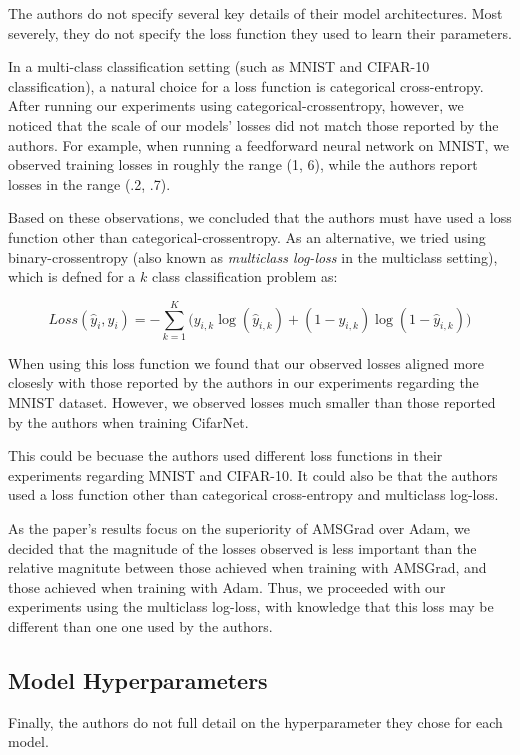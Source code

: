 \documentclass[letterpaper, 10 pt, conference]{ieeeconf}  %
\begin{document}
The authors do not specify several key details of their model architectures. Most severely, they do not specify the loss function they used to learn their parameters. 

In a multi-class classification setting (such as MNIST and CIFAR-10 classification), a natural choice for a loss function is categorical cross-entropy. After running our experiments using categorical-crossentropy, however, we noticed that the scale of our models' losses did not match those reported by the authors. For example, when running a feedforward neural network on MNIST, we observed training losses in roughly the range (1, 6), while the authors report losses in the range (.2, .7). 

Based on these observations, we concluded that the authors must have used a loss function other than categorical-crossentropy. As an alternative, we tried using binary-crossentropy (also known as \emph{multiclass log-loss} in the multiclass setting), which is defned for a $k$ class classification problem as:

\[
Loss(\hat{y}_i, y_i) = -\sum_{k = 1}^K \big( y_{i,k}\log(\hat{y}_{i,k}) + (1 - y_{i,k})\log(1 - \hat{y}_{i,k})  \big)
\]

When using this loss function we found that our observed losses aligned more closesly with those reported by the authors in our experiments regarding the MNIST dataset. However, we observed losses much smaller than those reported by the authors when training CifarNet. 

This could be becuase the authors used different loss functions in their experiments regarding MNIST and CIFAR-10. It could also be that the authors used a loss function other than categorical cross-entropy and multiclass log-loss.

As the paper's results focus on the superiority of AMSGrad over Adam, we decided that the magnitude of the losses observed is less important than the relative magnitute between those achieved when training with AMSGrad, and those achieved when training with Adam. Thus, we proceeded with our experiments using the multiclass log-loss, with knowledge that this loss may be different than one one used by the authors.

\subsection{Model Hyperparameters}

Finally, the authors do not full detail on the hyperparameter they chose for each model. 
\end{document}
